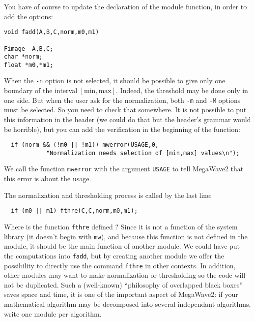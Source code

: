 You have of course to update the declaration of the module function, in order to
add the options:
\begin{verbatim}
void fadd(A,B,C,norm,m0,m1)

Fimage  A,B,C;
char *norm;
float *m0,*m1;
\end{verbatim}

When the \verb+-n+ option is not selected, it should be possible to give only one boundary of the interval $[\mbox{min},\mbox{max}]$.
Indeed, the threshold may be done only in one side.
But when the user ask for the normalization, both \verb+-m+ and \verb+-M+ options must
be selected.
So you need to check that somewhere.
It is not possible to put this information in the header (we could do that but the header's grammar would be horrible), but you can add the verification in the beginning of the function:
\begin{verbatim}
  if (norm && (!m0 || !m1)) mwerror(USAGE,0,
            "Normalization needs selection of [min,max] values\n");
\end{verbatim}
We call the function \verb+mwerror+ with the argument 
\verb+USAGE+ 
to tell MegaWave2 that this error is about the usage.

The normalization and thresholding process is called by the last line:
\begin{verbatim}
  if (m0 || m1) fthre(C,C,norm,m0,m1);
\end{verbatim}
Where is the function \verb+fthre+ defined ?
Since it is not a function of the system library (it doesn't begin with \verb+mw+),
and because this function is not defined in the module, it should be the main function
of another module.
We could have put the computations into \verb+fadd+, but by creating another module we
offer the possibility to directly use the command \verb+fthre+ in other contexts.
In addition, other modules may want to make normalization or thresholding so the code
will not be duplicated.
Such a (well-known) ``philosophy of overlapped black boxes'' saves space and time, it is
one of the important aspect of MegaWave2:
if your mathematical algorithm may be decomposed into several independant algorithms, write one module per algorithm.

